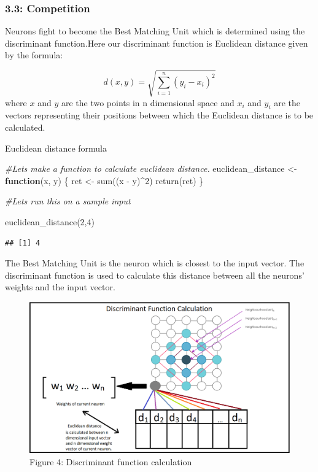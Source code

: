 \documentclass[
]{article}
\newenvironment{Shaded}{\begin{snugshade}}{\end{snugshade}}
\newcommand{\CommentTok}[1]{\textcolor[rgb]{0.56,0.35,0.01}{\textit{#1}}}
\newcommand{\ControlFlowTok}[1]{\textcolor[rgb]{0.13,0.29,0.53}{\textbf{#1}}}
\newcommand{\DecValTok}[1]{\textcolor[rgb]{0.00,0.00,0.81}{#1}}
\newcommand{\FunctionTok}[1]{\textcolor[rgb]{0.00,0.00,0.00}{#1}}
\newcommand{\NormalTok}[1]{#1}
\newcommand{\OtherTok}[1]{\textcolor[rgb]{0.56,0.35,0.01}{#1}}
\newcommand{\SpecialCharTok}[1]{\textcolor[rgb]{0.00,0.00,0.00}{#1}}
\begin{document}
\hypertarget{competition}{%
\subsubsection{3.3: Competition}\label{competition}}

Neurons fight to become the Best Matching Unit which is determined using
the discriminant function.Here our discriminant function is Euclidean
distance given by the formula:

\begin{equation}
 d\left( x,y\right) = \sqrt {\sum _{i=1}^{n}  \left( y_{i}- x_{i}\right)^2 } 
 \end{equation} where \(x\) and \(y\) are the two points in n
dimensional space and \(x_{i}\) and \(y_{i}\) are the vectors
representing their positions between which the Euclidean distance is to
be calculated.

Euclidean distance formula

\begin{Shaded}
\begin{Highlighting}[]
\CommentTok{\#Lets make a function to calculate euclidean distance.}
\NormalTok{euclidean\_distance }\OtherTok{\textless{}{-}} \ControlFlowTok{function}\NormalTok{(x, y) \{}
\NormalTok{  ret }\OtherTok{\textless{}{-}} \FunctionTok{sum}\NormalTok{((x }\SpecialCharTok{{-}}\NormalTok{ y)}\SpecialCharTok{\^{}}\DecValTok{2}\NormalTok{)}
  \FunctionTok{return}\NormalTok{(ret)}
\NormalTok{\}}

\CommentTok{\#Let\textquotesingle{}s run this on a sample input}

\FunctionTok{euclidean\_distance}\NormalTok{(}\DecValTok{2}\NormalTok{,}\DecValTok{4}\NormalTok{)}
\end{Highlighting}
\end{Shaded}

\begin{verbatim}
## [1] 4
\end{verbatim}

The Best Matching Unit is the neuron which is closest to the input
vector. The discriminant function is used to calculate this distance
between all the neurons' weights and the input vector.

\begin{figure}
\centering
\includegraphics{dis.png}
\caption{Figure 4: Discriminant function calculation}
\end{figure}
\end{document}
